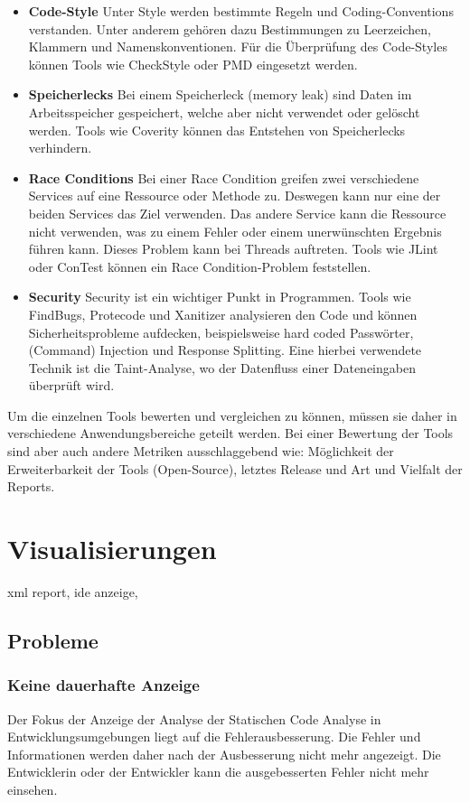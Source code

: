 \begin{itemize}
\item \textbf{Code-Style} Unter Style werden bestimmte Regeln und Coding-Conventions verstanden. Unter anderem gehören dazu Bestimmungen zu Leerzeichen, Klammern und Namenskonventionen. Für die Überprüfung des Code-Styles können Tools wie CheckStyle oder PMD eingesetzt werden.
\item \textbf{Speicherlecks}
Bei einem Speicherleck (memory leak) sind Daten im Arbeitsspeicher gespeichert,  welche aber nicht verwendet oder gelöscht werden. Tools wie Coverity können das Entstehen von Speicherlecks verhindern.
\item \textbf{Race Conditions}
Bei einer Race Condition greifen zwei verschiedene Services auf eine Ressource oder Methode zu. Deswegen kann nur eine der beiden Services das Ziel verwenden. Das andere Service kann die Ressource nicht verwenden, was zu einem Fehler oder einem unerwünschten Ergebnis führen kann. Dieses Problem kann bei Threads auftreten. Tools wie JLint oder ConTest können ein Race Condition-Problem feststellen.
\item \textbf{Security}
Security ist ein wichtiger Punkt in Programmen. Tools wie FindBugs, Protecode und Xanitizer analysieren den Code und können Sicherheitsprobleme aufdecken, beispielsweise hard coded Passwörter, (Command) Injection und Response Splitting. \cite{goseva2015capability} Eine hierbei verwendete Technik ist die Taint-Analyse, wo der Datenfluss einer Dateneingaben überprüft wird. \cite{jung2014sensitive}
\end{itemize}

Um die einzelnen Tools bewerten und vergleichen zu können, müssen sie daher in verschiedene Anwendungsbereiche geteilt werden. Bei einer Bewertung der Tools sind aber auch andere Metriken ausschlaggebend wie: Möglichkeit der Erweiterbarkeit der Tools (Open-Source), letztes Release und Art und Vielfalt der Reports. ~\parencite{comparativeAnalysisTools}

\section{Visualisierungen} 
xml report, ide anzeige, 
\subsection{Probleme} 

\subsubsection{Keine dauerhafte Anzeige} 
Der Fokus der Anzeige der Analyse der Statischen Code Analyse in Entwicklungsumgebungen liegt auf die Fehlerausbesserung. Die Fehler und Informationen werden daher nach der Ausbesserung nicht mehr angezeigt. Die Entwicklerin oder der Entwickler kann die ausgebesserten Fehler nicht mehr einsehen.

